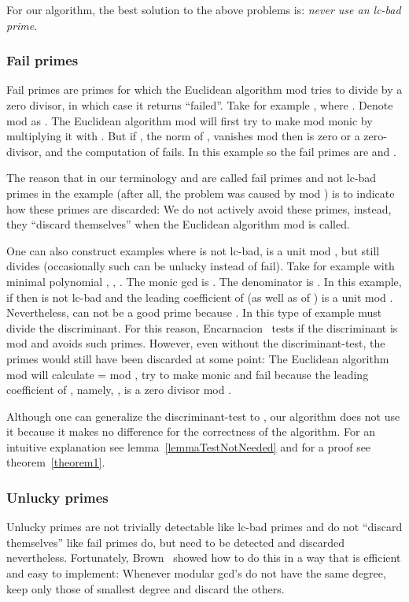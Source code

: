 \documentclass[10pt]{article}
\newcommand{\bad}{lc-bad }
\newcommand{\bbad}{lc-bad}
\begin{document}
For our algorithm, the best solution to the above problems is:
{\em never use  an \bad prime}.

\subsubsection{Fail primes}
Fail primes are primes for which the Euclidean algorithm mod 
tries to divide by a zero divisor, in which case it returns ``failed''.
Take for example ,  where .
Denote  mod  as .
The Euclidean algorithm mod  will first try to make  mod 
monic by multiplying it with .
But if , the norm of , vanishes mod 
then  is zero or a zero-divisor, and the computation of
 fails. In this example 
so the fail primes are  and .

The reason that in our terminology  and  are called fail primes
and not \bad primes in the example (after all, the problem was caused
by  mod )
is to indicate how these primes are discarded:
We do not actively avoid these primes, instead, they
``discard themselves'' when the Euclidean algorithm mod  is called.

One can also construct examples where  is not \bbad,
 is a unit mod ,
but  still divides   (occasionally such 
can be unlucky instead of fail).
Take for example  with minimal polynomial ,
,
.
The monic gcd is .
The denominator is .
In this example, if  then  is not \bad and the leading
coefficient of  (as well as of ) is a unit mod .
Nevertheless,  can not be a good prime because .
In this type of example  must divide the discriminant.
For this reason, Encarnacion~\cite{Encarnacion} tests if the
discriminant is  mod  and avoids such primes.
However, even without the discriminant-test,
the primes  would still have been discarded at some point:
The Euclidean algorithm mod 
will calculate  =  mod , try to make  monic
and fail because the leading coefficient of ,
namely, , is a zero divisor mod .


Although one can generalize the discriminant-test
to , our algorithm does not use it because it makes no difference for
the correctness of the algorithm.
For an intuitive explanation see lemma~\ref{lemmaTestNotNeeded} and for a proof see theorem~\ref{theorem1}.


\subsubsection{Unlucky primes}
Unlucky primes are not trivially detectable like \bad primes
and do not ``discard themselves'' like fail primes do, but
need to be detected and discarded nevertheless.
Fortunately, Brown~\cite{Brown} showed how to do this in
a way that is efficient and easy to
implement: Whenever modular gcd's do not have the
same degree, keep only those of smallest degree
and discard the others.
\end{document}
